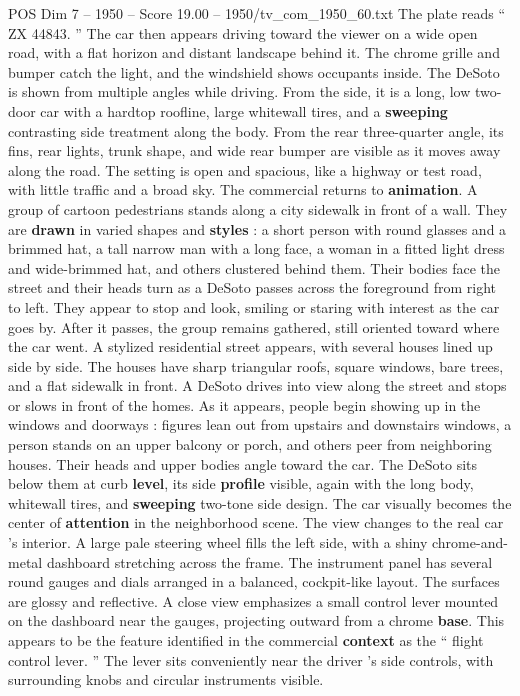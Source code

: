 \begin{textsample}{POS Dim 7 – 1950 – Score 19.00 – 1950/tv\_com\_1950\_60.txt}
The plate reads “ ZX 44843. ” The car then appears driving toward the viewer on a wide open road, with a flat horizon and distant landscape behind it.
The chrome grille and bumper catch the light, and the windshield shows occupants inside.
The DeSoto is shown from multiple angles while driving.
From the side, it is a long, low two-door car with a hardtop roofline, large whitewall tires, and a \textbf{sweeping} contrasting side treatment along the body.
From the rear three-quarter angle, its fins, rear lights, trunk shape, and wide rear bumper are visible as it moves away along the road.
The setting is open and spacious, like a highway or test road, with little traffic and a broad sky.
The commercial returns to \textbf{animation}.
A group of cartoon pedestrians stands along a city sidewalk in front of a wall.
They are \textbf{drawn} in varied shapes and \textbf{styles} : a short person with round glasses and a brimmed hat, a tall narrow man with a long face, a woman in a fitted light dress and wide-brimmed hat, and others clustered behind them.
Their bodies face the street and their heads turn as a DeSoto passes across the foreground from right to left.
They appear to stop and look, smiling or staring with interest as the car goes by.
After it passes, the group remains gathered, still oriented toward where the car went.
A stylized residential street appears, with several houses lined up side by side.
The houses have sharp triangular roofs, square windows, bare trees, and a flat sidewalk in front.
A DeSoto drives into view along the street and stops or slows in front of the homes.
As it appears, people begin showing up in the windows and doorways : figures lean out from upstairs and downstairs windows, a person stands on an upper balcony or porch, and others peer from neighboring houses.
Their heads and upper bodies angle toward the car.
The DeSoto sits below them at curb \textbf{level}, its side \textbf{profile} visible, again with the long body, whitewall tires, and \textbf{sweeping} two-tone side design.
The car visually becomes the center of \textbf{attention} in the neighborhood scene.
The view changes to the real car ’s interior.
A large pale steering wheel fills the left side, with a shiny chrome-and-metal dashboard stretching across the frame.
The instrument panel has several round gauges and dials arranged in a balanced, cockpit-like layout.
The surfaces are glossy and reflective.
A close view emphasizes a small control lever mounted on the dashboard near the gauges, projecting outward from a chrome \textbf{base}.
This appears to be the feature identified in the commercial \textbf{context} as the “ flight control lever. ” The lever sits conveniently near the driver ’s side controls, with surrounding knobs and circular instruments visible.

\end{textsample}
